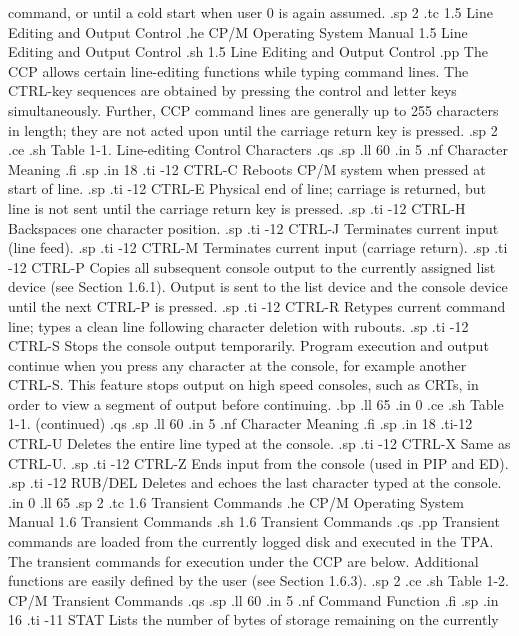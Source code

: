command, or until a cold start when user 0 is again assumed.
.sp 2
.tc    1.5  Line Editing and Output Control
.he CP/M Operating System Manual 1.5  Line Editing and Output Control
.sh
1.5  Line Editing and Output Control
.pp
The CCP allows certain line-editing functions while typing command lines.
The CTRL-key sequences are obtained by pressing the control and letter keys
simultaneously.  Further, CCP command lines are generally up to 255
characters in length; they are not acted upon until the carriage return key
is pressed.
.sp 2
.ce
.sh
Table 1-1.  Line-editing Control Characters
.qs
.sp
.ll 60
.in 5
.nf
Character                      Meaning
.fi
.sp
.in 18
.ti -12
CTRL-C      Reboots CP/M system when pressed at start of line.
.sp
.ti -12
CTRL-E      Physical end of line; carriage is returned, but line is not sent
until the carriage return key is pressed.
.sp
.ti -12
CTRL-H      Backspaces one character position.
.sp
.ti -12
CTRL-J      Terminates current input (line feed).
.sp
.ti -12
CTRL-M      Terminates current input (carriage return).
.sp
.ti -12
CTRL-P      Copies all subsequent console output to the currently
assigned list device (see Section 1.6.1).  Output is sent to the list device
and the console device until the next CTRL-P is pressed.
.sp
.ti -12
CTRL-R      Retypes current command line; types a clean line following
character deletion with rubouts.
.sp
.ti -12
CTRL-S      Stops the console output temporarily.  Program execution and
output continue when you press any character at the console, for 
example another CTRL-S.  This feature stops output on high speed consoles,
such as CRTs, in order to view a segment of output before continuing.
.bp
.ll 65
.in 0
.ce
.sh
Table 1-1.  (continued)
.qs
.sp
.ll 60
.in 5
.nf
Character                      Meaning
.fi
.sp
.in 18
.ti-12
CTRL-U      Deletes the entire line typed at the console.
.sp
.ti -12
CTRL-X      Same as CTRL-U.
.sp
.ti -12
CTRL-Z      Ends input from the console (used in PIP and ED).
.sp
.ti -12
RUB/DEL     Deletes and echoes the last character typed at the console.
.in 0
.ll 65
.sp 2
.tc    1.6  Transient Commands
.he CP/M Operating System Manual              1.6  Transient Commands
.sh
1.6  Transient Commands
.qs
.pp
Transient commands are loaded from the currently logged disk and executed in
the TPA.  The transient commands for execution under the CCP are below.
Additional functions are easily defined by the user (see Section 1.6.3).
.sp 2
.ce
.sh
Table 1-2.  CP/M Transient Commands
.qs
.sp
.ll 60
.in 5
.nf
Command                      Function
.fi
.sp
.in 16
.ti -11
STAT       Lists the number of bytes of storage remaining on the currently
